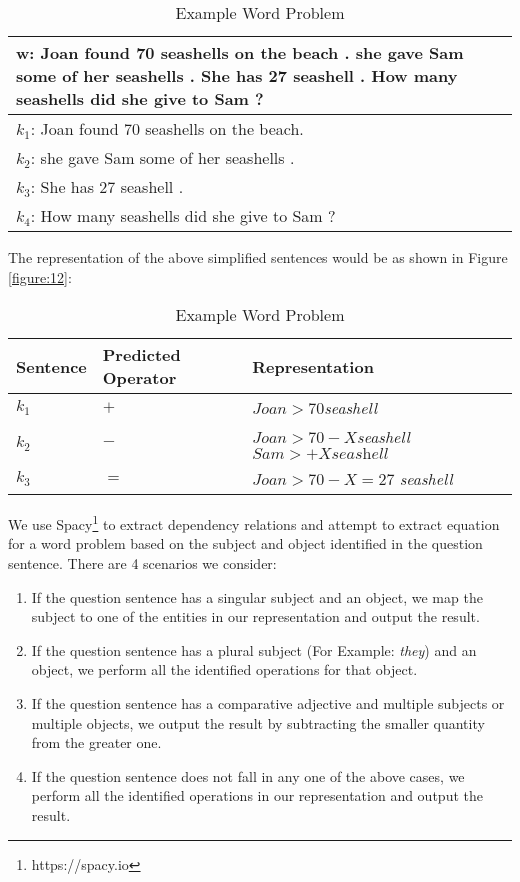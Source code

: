 \documentclass[11pt]{article}
\begin{document}
\begin{table}[h!]
\centering
\begin{tabular}{ | m{7cm} | }
\hline
 $\mathbf{w}$\textbf{: Joan found 70 seashells on the beach . she gave Sam some of her seashells . She has 27 seashell . How many seashells did she give to Sam ?}\\
\hline
$\mathit{k_{1}}$: Joan found 70 seashells on the beach.\\
\hline
$\mathit{k_{2}}$: she gave Sam some of her seashells .\\
\hline
$\mathit{k_{3}}$: She has 27 seashell .\\
\hline
$\mathit{k_{4}}$: How many seashells did she give to Sam ?\\
\hline
\end{tabular}
\caption{Example Word Problem}
\label{figure:11}
\end{table}

The representation of the above simplified sentences would be as shown in Figure \ref{figure:12}:
\begin{table}[h!]
\centering
\begin{tabular}{ |p{1.3cm}|p{1.7cm}|p{3.7cm}| }
\hline
\textbf{Sentence} & \textbf{Predicted Operator} & \textbf{Representation} \\ \hline
$\mathit{k_{1}}$ & $\mathit{+}$ & $\mathit{Joan > 70}$\textit{seashell} \\ \hline
$\mathit{k_{2}}$ & $\mathit{-}$ & $\mathit{Joan> 70 - X}$\textit{seashell} $\mathit{Sam > +X}\textit{seashell}$ \\ \hline
$\mathit{k_{3}}$ & $\mathit{=}$ & $\mathit{Joan > 70 - X = 27}$ \textit{seashell}\\ \hline
\end{tabular}
\caption{Example Word Problem}
\label{figure:11}
\end{table}



We use Spacy\footnote{https://spacy.io} to extract dependency relations and attempt to extract equation for a word problem based on the subject and object identified in the question sentence. There are 4 scenarios we consider:
\begin{enumerate}
\item If the question sentence has a singular subject and an object, we map the subject to one of the entities in our representation and output the result.
\item If the question sentence has a plural subject (For Example: \textit{they}) and an object, we perform all the identified operations for that object.
\item If the question sentence has a comparative adjective and multiple subjects or multiple objects, we output the result by subtracting the smaller quantity from the greater one.
\item If the question sentence does not fall in any one of the above cases, we perform all the identified operations in our representation and output the result.
\end{enumerate}
\end{document}
